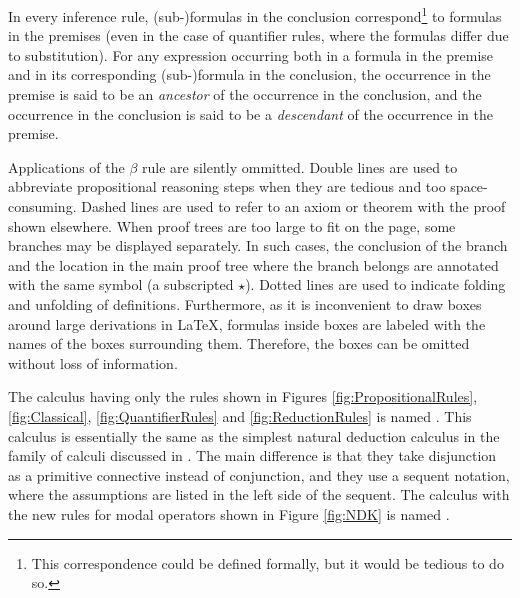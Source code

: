 \documentclass[smallextended]{svjour3}
\begin{document}
In every inference rule, (sub-)formulas in the conclusion correspond\footnote{This correspondence could be defined formally, but it would be tedious to do so.} to formulas in the premises (even in the case of quantifier rules, where the formulas differ due to substitution). For any expression occurring both in a formula in the premise and in its corresponding (sub-)formula in the conclusion, the occurrence in the premise is said to be an \emph{ancestor} of the occurrence in the conclusion, and the occurrence in the conclusion is said to be a \emph{descendant} of the occurrence in the premise.


\newcommand{\subproof}{\star}

Applications of the $\beta$ rule are silently ommitted. Double lines are used to abbreviate propositional reasoning steps when they are tedious and too space-consuming. Dashed lines are used to refer to an axiom or theorem with the proof shown elsewhere. When proof trees are too large to fit on the page, some branches may be displayed separately. In such cases, the conclusion of the branch and the location in the main proof tree where the branch belongs are annotated with the same symbol (a subscripted $\subproof$). Dotted lines are used to indicate folding and unfolding of definitions. Furthermore, as it is inconvenient to draw boxes around large derivations in \LaTeX, formulas inside boxes are labeled with the names of the boxes surrounding them. Therefore, the boxes can be omitted without loss of information. 

The calculus having only the rules shown in Figures \ref{fig:PropositionalRules}, \ref{fig:Classical}, \ref{fig:QuantifierRules} and \ref{fig:ReductionRules} is named \ND. This calculus is essentially the same as the simplest natural deduction calculus in the family of calculi discussed in \citep{BenzmuellerBrownKohlhase}. The main difference is that they take disjunction as a primitive connective instead of conjunction, and they use a sequent notation, where the assumptions are listed in the left side of the sequent. The calculus with the new rules for modal operators shown in Figure \ref{fig:NDK} is named \NDK.

\newcommand{\s}{\qquad}
\end{document}
